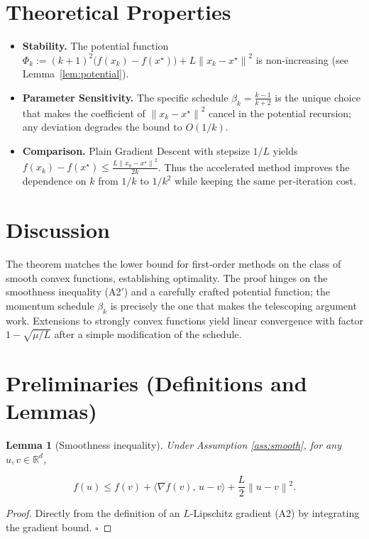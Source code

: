 \documentclass{article}
\newtheorem{lemma}{Lemma}
\newcommand{\grad}{\nabla}
\newcommand{\R}{\mathbb{R}}
\newcommand{\norm}[1]{\left\|#1\right\|}
\begin{document}
\section*{Theoretical Properties}
\begin{itemize}[leftmargin=*]
\item \textbf{Stability.} The potential function
\(\Phi_k:= (k+1)^{2}\bigl(f(x_k)-f(x^{\star})\bigr)
+L\norm{x_k-x^{\star}}^{2}\)
is non‑increasing (see Lemma~\ref{lem:potential}).
\item \textbf{Parameter Sensitivity.}
The specific schedule \(\beta_k=\frac{k-1}{k+2}\) is the unique choice that
makes the coefficient of \(\norm{x_k-x^{\star}}^{2}\) cancel in the
potential recursion; any deviation degrades the bound to \(O(1/k)\).
\item \textbf{Comparison.}
Plain Gradient Descent with stepsize \(1/L\) yields
\(f(x_k)-f(x^{\star})\le \frac{L\norm{x_0-x^{\star}}^{2}}{2k}\).
Thus the accelerated method improves the dependence on \(k\) from
\(1/k\) to \(1/k^{2}\) while keeping the same per‑iteration cost.
\end{itemize}

\section*{Discussion}
The theorem matches the lower bound for first‑order methods on the class
of smooth convex functions, establishing optimality. The proof hinges on
the smoothness inequality (A2$'$) and a carefully crafted potential
function; the momentum schedule \(\beta_k\) is precisely the one that
makes the telescoping argument work. Extensions to strongly convex
functions yield linear convergence with factor \(1-\sqrt{\mu/L}\) after
a simple modification of the schedule.

\newpage
\section*{Preliminaries (Definitions and Lemmas)}
\begin{lemma}[Smoothness inequality]\label{lem:smooth}
Under Assumption \ref{ass:smooth}, for any \(u,v\in\R^{d}\),

\[
f(u)\le f(v)+\langle \grad f(v),\,u-v\rangle+\frac{L}{2}\norm{u-v}^{2}.
\tag{L1}
\]
\end{lemma}
\begin{proof}
Directly from the definition of an \(L\)-Lipschitz gradient (A2) by
integrating the gradient bound. \hfill\(\square\)
\end{proof}
\end{document}

